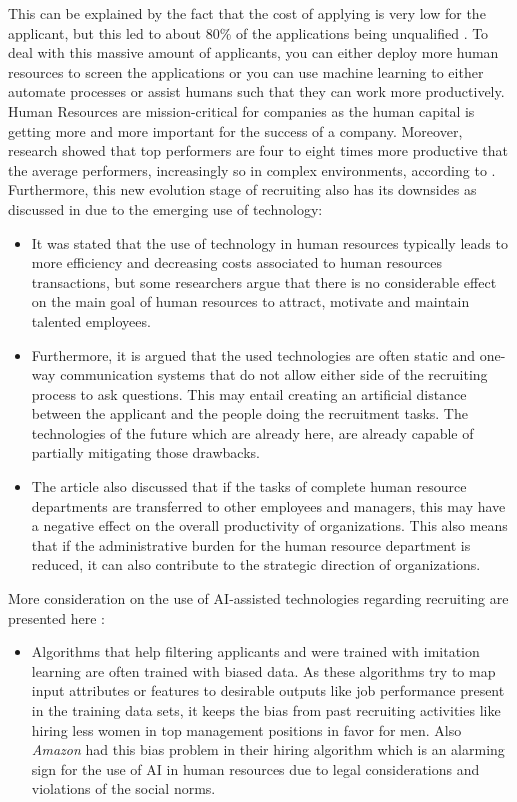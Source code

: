 \documentclass[draft,final]{thesisclass} %
\begin{document}
\begin{enumerate}
    This can be explained by the fact that the cost of applying is very low for the applicant, but this led to about 80\% of the applications being unqualified \parencite[4]{ai_recruiting}.
    To deal with this massive amount of applicants, you can either deploy more human resources to screen the applications or you can use machine learning to either automate processes or assist humans such that they can work more productively.
    Human Resources are mission-critical for companies as the human capital is getting more and more important for the success of a company.
    Moreover, research showed that top performers are four to eight times more productive that the average performers, increasingly so in complex environments, according to \textcite[4]{ai_recruiting}.
    Furthermore, this new evolution stage of recruiting also has its downsides as discussed in \textcite[4-5]{challenges_opportunities_hr} due to the emerging use of technology:
    \begin{itemize}
        \item It was stated that the use of technology in human resources typically leads to more efficiency and decreasing costs associated to human resources transactions, but some researchers argue that there is no considerable effect on the main goal of human resources to attract, motivate and maintain talented employees. 
        \item Furthermore, it is argued that the used technologies are often static and one-way communication systems that do not allow either side of the recruiting process to ask questions. This may entail creating an artificial distance between the applicant and the people doing the recruitment tasks. The technologies of the future which are already here, are already capable of partially mitigating those drawbacks.
        \item The article also discussed that if the tasks of complete human resource departments are transferred to other employees and managers, this may have a negative effect on the overall productivity of organizations. This also means that if the administrative burden for the human resource department is reduced, it can also contribute to the strategic direction of organizations.
    \end{itemize}
    More consideration on the use of \acs{AI}-assisted technologies regarding recruiting are presented here \parencite[2-4]{ai_in_hr_management}:
    \begin{itemize}
        \item Algorithms that help filtering applicants and were trained with imitation learning are often trained with biased data. As these algorithms try to map input attributes or features to desirable outputs like job performance present in the training data sets, it keeps the bias from past recruiting activities like hiring less women in top management positions in favor for men. Also \textit{Amazon} had this bias problem in their hiring algorithm which is an alarming sign for the use of \acs{AI} in human resources due to legal considerations and violations of the social norms.

\end{itemize}
\end{enumerate}
\end{document}
